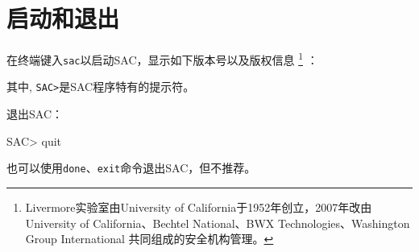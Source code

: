 \section{启动和退出}
在终端键入\lstinline{sac}以启动SAC，显示如下版本号以及版权信息
\footnote{Livermore实验室由University of California于1952年创立，2007年改由
University of California、Bechtel National、BWX Technologies、Washington Group International
共同组成的安全机构管理。}
：

其中, \lstinline{SAC>}是SAC程序特有的提示符。

退出SAC：
\begin{SACCode}
SAC> quit
\end{SACCode}

也可以使用\lstinline{done}、\lstinline{exit}命令退出SAC，但不推荐。
